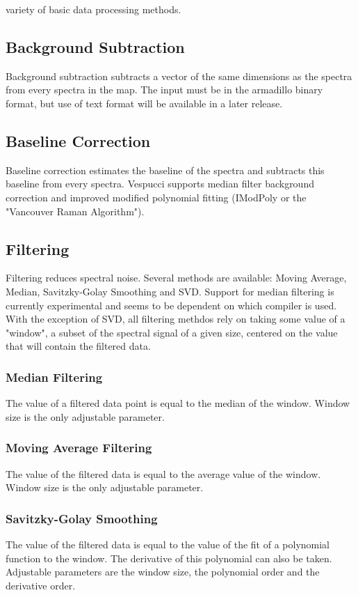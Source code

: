 \documentclass[12pt]{achemso} %
\begin{document}
variety of basic data processing methods.

\subsection{Background Subtraction} Background subtraction subtracts a vector of
the same dimensions as the spectra from every spectra in the map. The input must
be in the armadillo binary format, but use of text format will be available in a
later release.

\subsection{Baseline Correction} Baseline correction estimates the baseline of
the spectra and subtracts this baseline from every spectra. Vespucci supports
median filter background correction and improved modified polynomial fitting
(IModPoly or the "Vancouver Raman Algorithm").

\subsection{Filtering} Filtering reduces spectral noise. Several methods are
available: Moving Average, Median, Savitzky-Golay Smoothing and SVD. Support for
median filtering is currently experimental and seems to be dependent on which
compiler is used. With the exception of SVD, all filtering methdos rely on
taking some value of a "window", a subset of the spectral signal of a given
size, centered on the value that will contain the filtered data.

\subsubsection{Median Filtering} The value of a filtered data point is equal to
the median of the window. Window size is the only adjustable parameter.
\subsubsection{Moving Average Filtering} The value of the filtered data is equal
to the average value of the window. Window size is the only adjustable
parameter. 

\subsubsection{Savitzky-Golay Smoothing} The value of the filtered
data is equal to the value of the fit of a polynomial function to the window.
The derivative of this polynomial can also be taken. Adjustable parameters are
the window size, the polynomial order and the derivative order.
\end{document}
